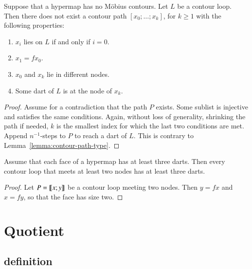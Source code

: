 \begin{lemma}\label{lemma:contour-f}
Suppose that a hypermap has no M\"obius contours.  Let $L$ be a
contour loop.  Then there does not exist a contour path
$[x_0;\ldots;x_k]$, for $k\ge 1$ with the following properties:
\begin{enumerate}
\item $x_i$ lies on $L$ if and only if $i=0$.
\item $x_1 = f x_0$.
\item $x_0$ and $x_k$ lie in different nodes.
\item Some dart of $L$ is at the node of $x_k$.
\end{enumerate}
\end{lemma}


\begin{proof} Assume for a contradiction that the path $P$ exists.
Some sublist is injective and satisfies the same conditions.  Again,
without loss of generality, shrinking the path if needed, $k$ is the
smallest index for which the last two conditions are met.  Append
$n^{-1}$-steps to $P$ to reach a dart of $L$.  This is contrary to
Lemma~\ref{lemma:contour-path-type}.
\end{proof}

\begin{lemma}\label{lemma:3dart}  
Assume that each face of a hypermap  has at least three darts.
Then every contour loop that meets at least two nodes has at least
three darts.
\end{lemma}

\begin{proof} Let $P={\llbracket{x;y}\rrbracket}$ be a contour loop meeting two nodes.  Then
$y = f x$ and $x = f y$, so that the face has size two.
\end{proof}


\section{Quotient}
%

\subsection{definition}


